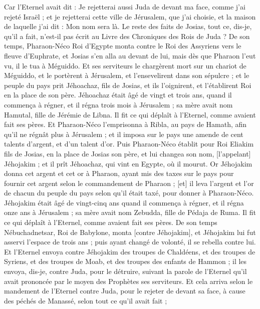 \begin{multicols}{2}
Car l'Eternel avait dit : Je rejetterai aussi Juda de devant ma face, comme j'ai rejeté Israël ; et je rejetterai cette ville de Jérusalem, que j'ai choisie, et la maison de laquelle j'ai dit : Mon nom sera là.
Le reste des faits de Josias, tout ce, dis-je, qu'il a fait, n'est-il pas écrit au Livre des Chroniques des Rois de Juda ?
De son temps, Pharaon-Néco Roi d'Egypte monta contre le Roi des Assyriens vers le fleuve d'Euphrate, et Josias s'en alla au devant de lui, mais dès que Pharaon l'eut vu, il le tua à Méguiddo.
Et ses serviteurs le chargèrent mort sur un chariot de Méguiddo, et le portèrent à Jérusalem, et l'ensevelirent dans son sépulcre ; et le peuple du pays prit Jéhoachaz, fils de Josias, et ils l'oignirent, et l'établirent Roi en la place de son père.
Jéhoachaz était âgé de vingt et trois ans, quand il commença à régner, et il régna trois mois à Jérusalem ; sa mère avait nom Hamutal, fille de Jérémie de Libna.
Il fit ce qui déplaît à l'Eternel, comme avaient fait ses pères.
Et Pharaon-Néco l'emprisonna à Ribla, au pays de Hamath, afin qu'il ne régnât plus à Jérusalem ; et il imposa sur le pays une amende de cent talents d'argent, et d'un talent d'or.
Puis Pharaon-Néco établit pour Roi Eliakim fils de Josias, en la place de Josias son père, et lui changea son nom, [l'appelant] Jéhojakim ; et il prît Jéhoachaz, qui vint en Egypte, où il mourut.
Or Jéhojakim donna cet argent et cet or à Pharaon, ayant mis des taxes sur le pays pour fournir cet argent selon le commandement de Pharaon ; [et] il leva l'argent et l'or de chacun du peuple du pays selon qu'il était taxé, pour donner à Pharaon-Néco.
Jéhojakim était âgé de vingt-cinq ans quand il commença à régner, et il régna onze ans à Jérusalem ; sa mère avait nom Zebudda, fille de Pédaja de Ruma.
Il fit ce qui déplaît à l'Eternel, comme avaient fait ses pères.
\VerseOne{}De son temps Nébuchadnetsar, Roi de Babylone, monta [contre Jéhojakim], et Jéhojakim lui fut asservi l'espace de trois ans ; puis ayant changé de volonté, il se rebella contre lui.
Et l'Eternel envoya contre Jéhojakim des troupes de Chaldéens, et des troupes de Syriens, et des troupes de Moab, et des troupes des enfants de Hammon ; il les envoya, dis-je, contre Juda, pour le détruire, suivant la parole de l'Eternel qu'il avait prononcée par le moyen des Prophètes ses serviteurs.
Et cela arriva selon le mandement de l'Eternel contre Juda, pour le rejeter de devant sa face, à cause des péchés de Manassé, selon tout ce qu'il avait fait ;

\end{multicols}
